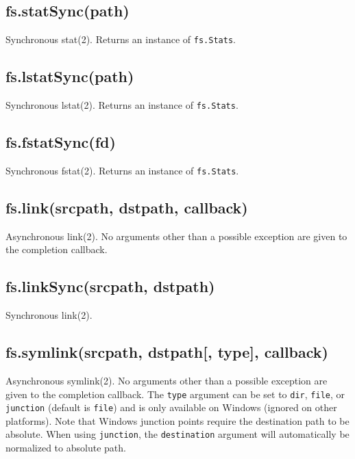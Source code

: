 \subsection{fs.statSync(path)}\label{fs.statsyncpath}

Synchronous stat(2). Returns an instance of \texttt{fs.Stats}.

\subsection{fs.lstatSync(path)}\label{fs.lstatsyncpath}

Synchronous lstat(2). Returns an instance of \texttt{fs.Stats}.

\subsection{fs.fstatSync(fd)}\label{fs.fstatsyncfd}

Synchronous fstat(2). Returns an instance of \texttt{fs.Stats}.

\subsection{fs.link(srcpath, dstpath,
callback)}\label{fs.linksrcpath-dstpath-callback}

Asynchronous link(2). No arguments other than a possible exception are
given to the completion callback.

\subsection{fs.linkSync(srcpath,
dstpath)}\label{fs.linksyncsrcpath-dstpath}

Synchronous link(2).

\subsection{fs.symlink(srcpath, dstpath{[}, type{]},
callback)}\label{fs.symlinksrcpath-dstpath-type-callback}

Asynchronous symlink(2). No arguments other than a possible exception
are given to the completion callback. The \texttt{type} argument can be
set to \texttt{\textquotesingle{}dir\textquotesingle{}},
\texttt{\textquotesingle{}file\textquotesingle{}}, or
\texttt{\textquotesingle{}junction\textquotesingle{}} (default is
\texttt{\textquotesingle{}file\textquotesingle{}}) and is only available
on Windows (ignored on other platforms). Note that Windows junction
points require the destination path to be absolute. When using
\texttt{\textquotesingle{}junction\textquotesingle{}}, the
\texttt{destination} argument will automatically be normalized to
absolute path.

